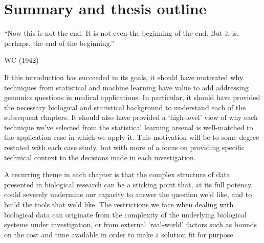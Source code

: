 \documentclass[thesis.tex]{subfiles}
\begin{document}


\section{Summary and thesis outline}
\epigraph{``Now this is not the end. It is not even the beginning of the end. But it is, perhaps, the end of the beginning.''}{WC (1942)}

If this introduction has succeeded in its goals, it should have motivated why techniques from statistical and machine learning have value to add addressing genomics questions in medical applications. In particular, it should have provided the necessary biological and statistical background to understand each of the subsequent chapters. It should also have provided a `high-level' view of why each technique we've selected from the statistical learning arsenal is well-matched to the application case in which we apply it. This motivation will be to some degree restated with each case study, but with more of a focus on providing specific technical context to the decisions made in each investigation.

A recurring theme in each chapter is that the complex structure of data presented in biological research can be a sticking point that, at its full potency, could severely undermine our capacity to answer the question we'd like, and to build the tools that we'd like. The restrictions we face when dealing with biological data can originate from the complexity of the underlying biological systems under investigation, or from external `real-world' factors such as bounds on the cost and time available in order to make a solution fit for purpose.
\end{document}
